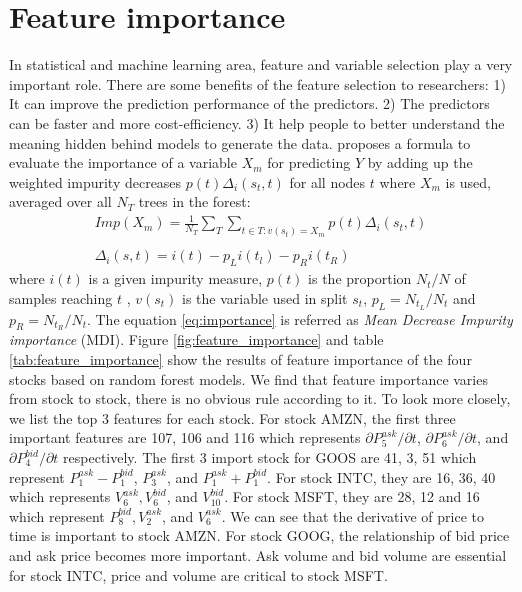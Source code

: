 \section{Feature importance}
In statistical and machine learning area,   feature and variable selection play a very important role. There are some benefits of the feature selection to researchers: 1) It can improve the prediction performance of the predictors. 2) The predictors can be faster and more cost-efficiency. 3) It help people to better understand the meaning hidden behind models to generate the data.  
\cite{breiman2001random} proposes a formula to evaluate the importance of a variable $X_m$ for predicting $Y$ by adding up the weighted impurity decreases $p(t)\Delta_i(s_t,  t)$ for all nodes $t$ where $X_m$ is used,   averaged over all $N_T$ trees in the forest:
\begin{equation}\label{eq:importance}
\begin{aligned}
Imp(X_m)=\frac{1}{N_T}\sum_T\sum_{t\in T:v(s_t)=X_m}p(t)\Delta_i(s_t,  t)\\
\\
\Delta_i(s,t)=i(t)-p_Li(t_l)-p_Ri(t_R)
\end{aligned}
\end{equation}
where $i(t)$ is a given impurity measure, $p(t)$ is the proportion $N_t/N$ of samples reaching $t$ , $v(s_t)$ is the variable used in split $s_t$, $p_L=N_{t_L}/N_t$ and $p_R=N_{t_R}/N_t$. The equation \ref{eq:importance} is referred as \textit{Mean Decrease Impurity importance} (MDI). Figure \ref{fig:feature_importance} and table \ref{tab:feature_importance} show the results of feature importance of the four stocks based on random forest models. We find that feature importance varies from stock to stock,   there is no obvious rule according to it. To look more closely,   we list the top 3 features for each stock. For stock AMZN,   the first three important features are 107,   106 and 116 which represents $\partial P_5^{ask}/\partial t$,   $\partial P_6^{ask}/\partial t$,   and $\partial P_4^{bid}/\partial t$ respectively. The first 3 import stock for GOOS are 41,  3,  51 which represent $P_1^{ask}-P_1^{bid}$,   $P_3^{ask}$,   and $P_1^{ask}+P_1^{bid}$. For stock INTC,   they are 16,  36,  40 which represents $V_6^{ask},  V_6^{bid}$,   and $V_{10}^{bid}$. For stock MSFT,   they are 28,  12 and 16 which represent $P_8^{bid},  V_2^{ask}$,   and $V_6^{ask}$. We can see that the derivative of price to time is important to stock AMZN. For stock GOOG,   the relationship of bid price and ask price becomes more important. Ask volume and bid volume are essential for stock INTC,   price and volume are critical to stock MSFT.   


